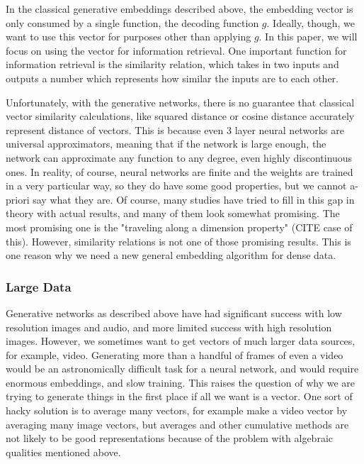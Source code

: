 \documentclass{article}
\begin{document}
	In the classical generative embeddings described above, the embedding vector is only consumed by a single function, the decoding function $g$. Ideally, though, we want to use this vector for purposes other than applying $g$. In this paper, we will focus on using the vector for information retrieval. One important function for information retrieval is the similarity relation, which takes in two inputs and outputs a number which represents how similar the inputs are to each other. 
	
	Unfortunately, with the generative networks, there is no guarantee that classical vector similarity calculations, like squared distance or cosine distance accurately represent distance of vectors. This is because even 3 layer neural networks are universal approximators, meaning that if the network is large enough, the network can approximate any function to any degree, even highly discontinuous ones. In reality, of course, neural networks are finite and the weights are trained in a very particular way, so they do have some good properties, but we cannot a-priori say what they are. Of course, many studies have tried to fill in this gap in theory with actual results, and many of them look somewhat promising. The most promising one is the "traveling along a dimension property" (CITE case of this). However, similarity relations is not one of those promising results. This is one reason why we need a new general embedding algorithm for dense data. 
	
	\subsubsection{Large Data}
	
	Generative networks as described above have had significant success with low resolution images and audio, and more limited success with high resolution images. However, we sometimes want to get vectors of much larger data sources, for example, video. Generating more than a handful of frames of even a video would be an astronomically difficult task for a neural network, and would require enormous embeddings, and slow training. This raises the question of why we are trying to generate things in the first place if all we want is a vector. One sort of hacky solution is to average many vectors, for example make a video vector by averaging many image vectors, but averages and other cumulative methods are not likely to be good representations because of the problem with algebraic qualities mentioned above. 
	
\end{document}
